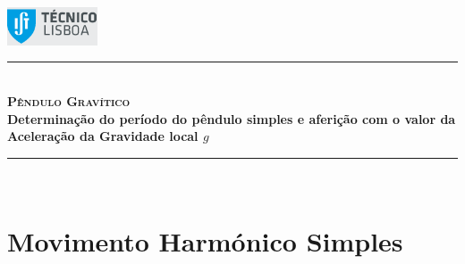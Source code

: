 \documentclass[a4paper,twoside,12pt]{article}      %
\author{Prof. Bernardo B. Carvalho}
\date{ Setembro 2014}
\newcommand{\HRule}{\rule{\linewidth}{0.5mm}}
\begin{document}
 

\includegraphics[width=0.2\textwidth]{../logo-ist}%
	
	\HRule \\[0.5cm]
	{ \huge   \bfseries \textsc{ Pêndulo Gravítico } }\\[0.4cm]
	{ \large \bfseries Determinação do período do pêndulo simples e aferição com o valor da Aceleração da Gravidade local $g$  }\\
	\HRule \\%
	
%	 


\section{\sf Movimento Harmónico Simples}
\end{document}
